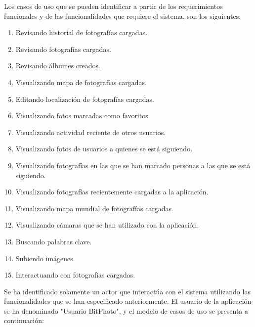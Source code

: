 \documentclass{memoria}
\begin{document}


Los casos de uso que se pueden identificar a partir de los requerimientos funcionales y de las funcionalidades que requiere el sistema, son los siguientes:

\begin{enumerate}
    \item Revisando historial de fotografías cargadas.
    \item Revisando fotografías cargadas.
    \item Revisando álbumes creados.
    \item Visualizando mapa de fotografías cargadas.
    \item Editando localización de fotografías cargadas.
    \item Visualizando fotos marcadas como favoritos.
    \item Visualizando actividad reciente de otros usuarios.
    \item Visualizando fotos de usuarios a quienes se está siguiendo.
    \item Visualizando fotografías en las que se han marcado personas a las que se está siguiendo.
    \item Visualizando fotografías recientemente cargadas a la aplicación.
    \item Visualizando mapa mundial de fotografías cargadas.
    \item Visualizando cámaras que se han utilizado con la aplicación.
    \item Buscando palabras clave.
    \item Subiendo imágenes.
    \item Interactuando con fotografías cargadas.
\end{enumerate}
\newpage
{}

Se ha identificado solamente un actor que interactúa con el sistema utilizando las funcionalidades que se han especificado anteriormente. El usuario de la aplicación se ha denominado "Usuario BitPhoto", y el modelo de casos de uso se presenta a continuación:\\
\end{document}
